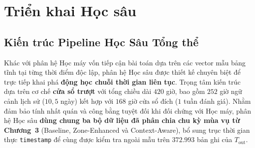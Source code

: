 \section{Triển khai Học sâu}

\subsection{Kiến trúc Pipeline Học Sâu Tổng thể}

Khác với phân hệ Học máy vốn tiếp cận bài toán dựa trên các vector mẫu bảng tĩnh tại từng thời điểm độc lập, phân hệ Học sâu được thiết kế chuyên biệt để trực tiếp khai phá \textbf{động học chuỗi thời gian liên tục}. Trọng tâm kiến trúc dựa trên cơ chế \textbf{cửa sổ trượt} với tổng chiều dài $420$ giờ, bao gồm $252$ giờ ngữ cảnh lịch sử ($10{,}5$ ngày) kết hợp với $168$ giờ cửa sổ đích ($1$ tuần đánh giá). Nhằm đảm bảo tính nhất quán và công bằng tuyệt đối khi đối chứng với Học máy, phân hệ Học sâu \textbf{dùng chung ba bộ dữ liệu đã phân chia chu kỳ mùa vụ từ Chương~3} (Baseline, Zone-Enhanced và Context-Aware), bổ sung trục thời gian thực \texttt{timestamp} để cùng được kiểm tra ngoài mẫu trên $372.993$ bản ghi của $T_{\text{out}}$.

